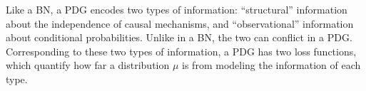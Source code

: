 \documentclass{article}
\begin{document}
Like a BN, a PDG encodes
two types of information: ``structural'' 
information about the independence of causal mechanisms,
and ``observational'' information
about conditional probabilities.
Unlike in a BN, the two can conflict in a PDG.
Corresponding to these two types of information,
a PDG has
two loss functions,
which quantify how far a distribution $\mu$ is from
modeling the information of each type.
%
\end{document}
